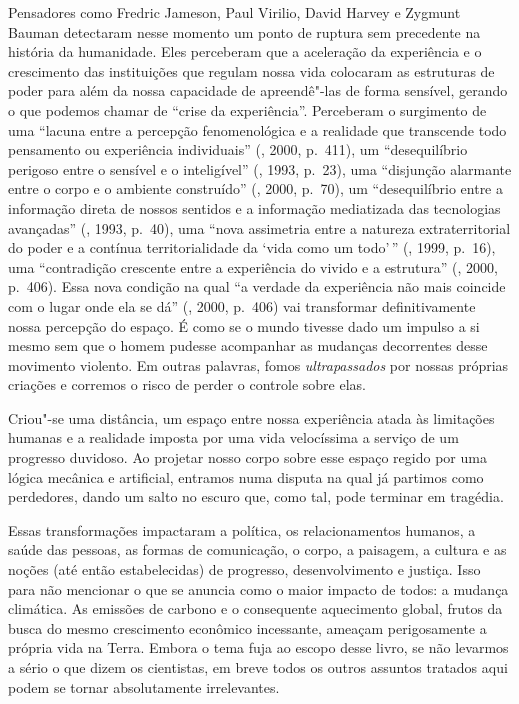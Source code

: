 Pensadores como Fredric Jameson, Paul Virilio, David Harvey e Zygmunt Bauman
detectaram nesse momento um ponto de ruptura sem precedente na história \label{ruptura}
da humanidade. Eles perceberam que a aceleração da experiência e o
crescimento das instituições que regulam nossa vida colocaram as
estruturas de poder para além da nossa capacidade de apreendê"-las de
forma sensível, gerando o que podemos chamar de ``crise da
experiência''. Perceberam o surgimento de uma ``lacuna entre a percepção
fenomenológica e a realidade que transcende todo pensamento ou
experiência individuais'' (, 2000, p.~411), um ``desequilíbrio
perigoso entre o sensível e o inteligível'' (, 1993, p.~23), uma
``disjunção alarmante entre o corpo e o ambiente construído'' (,
2000, p.~70), um ``desequilíbrio entre a informação direta de nossos
sentidos e a informação mediatizada das tecnologias avançadas''
(, 1993, p.~40), uma ``nova assimetria entre a natureza
extraterritorial do poder e a contínua territorialidade da `vida como um
todo'\,'' (, 1999, p.~16), uma ``contradição crescente entre a
experiência do vivido e a estrutura'' (, 2000, p.~406). Essa nova
condição na qual ``a verdade da experiência não mais coincide com o lugar
onde ela se dá'' (, 2000, p.~406) vai transformar definitivamente
nossa percepção do espaço. É como se o mundo tivesse dado um impulso a
si mesmo sem que o homem pudesse acompanhar as mudanças decorrentes
desse movimento violento. Em outras palavras, fomos \emph{ultrapassados}
por nossas próprias criações e corremos o risco de perder o controle
sobre elas.

Criou"-se uma distância, um espaço entre nossa experiência atada às
limitações humanas e a realidade imposta por uma vida velocíssima a
serviço de um progresso duvidoso. Ao projetar nosso corpo sobre esse
espaço regido por uma lógica mecânica e artificial, entramos numa
disputa na qual já partimos como perdedores, dando um salto no escuro
que, como tal, pode terminar em tragédia.

Essas transformações impactaram a política, os relacionamentos humanos, a saúde
das pessoas, as formas de comunicação, o corpo, a paisagem, a cultura e
as noções (até então estabelecidas) de progresso, desenvolvimento e
justiça. Isso para não mencionar o que se anuncia como o maior impacto
de todos: a mudança climática. As emissões de carbono e o consequente
aquecimento global, frutos da busca do mesmo crescimento econômico
incessante, ameaçam perigosamente a própria vida na Terra. Embora o tema
fuja ao escopo desse livro, se não levarmos a sério o que dizem os
cientistas, em breve todos os outros assuntos tratados aqui podem se
tornar absolutamente irrelevantes.

